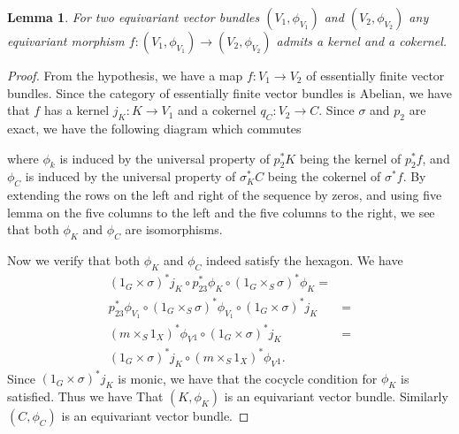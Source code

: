 \documentclass{article}
\newtheorem{lemma}{Lemma}
\begin{document}
\begin{lemma}
  For two equivariant vector bundles $(V_1,\phi_{V_1})$ and $(V_2,\phi_{V_2})$ any equivariant morphism
  $f:(V_1,\phi_{V_1})\rightarrow (V_2,\phi_{V_2})$ admits a kernel and a cokernel.
\end{lemma}
\begin{proof}
  From the hypothesis, we have a map $f:V_1 \rightarrow V_2$ of essentially finite vector bundles. Since the 
  category of essentially finite vector bundles is Abelian, we have that $f$ has a kernel $j_K:K\rightarrow V_1$ 
  and a cokernel $q_C:V_2 \rightarrow C$. Since $\sigma$ and $p_2$ are exact, we have the following diagram which 
  commutes
  \begin{center}
  \end{center}
  where $\phi_k$ is induced by the universal property of $p_2^* K$ being the kernel of $p_2^* f$, and $\phi_C$ is 
  induced by the universal property of $\sigma_K ^* C$ being the cokernel of $\sigma ^* f$. 
  By extending the rows on the left and right of the sequence by zeros, and using five lemma on 
  the five columns to the left and the five columns to the right,
  we see that both $\phi_K$ and $\phi_C$ are isomorphisms.

  Now we verify that both $\phi_K$ and $\phi_C$ indeed satisfy the hexagon. We have 
  \begin{align*}
    (1_G\times \sigma)^*j_K\circ p_{23}^* \phi_{K} \circ (1_G \times _S \sigma)^*\phi_{K} =&\\
    p_{23}^* \phi_{V_1} \circ (1_G \times _S \sigma)^*\phi_{V_1} \circ (1_G\times \sigma)^*j_K&= \\
    (m \times _S 1_X)^*\phi_V{_1}\circ (1_G\times \sigma)^*j_K&= \\
    (1_G\times \sigma)^*j_K\circ (m \times _S 1_X)^*\phi_V{_1}.
  \end{align*}
  Since $(1_G\times \sigma)^*j_K$ is monic, we have that the cocycle condition for $\phi_K$ is satisfied. Thus we have
  That $(K,\phi_K)$ is an equivariant vector bundle. Similarly $(C,\phi_C)$ is an equivariant vector bundle.
\end{proof}
\end{document}
